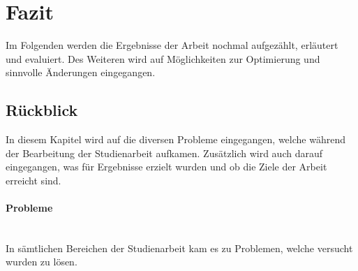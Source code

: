 \section{Fazit}
Im Folgenden werden die Ergebnisse der Arbeit nochmal aufgezählt, erläutert und evaluiert.
Des Weiteren wird auf Möglichkeiten zur Optimierung und sinnvolle Änderungen eingegangen.

\subsection{Rückblick}
In diesem Kapitel wird auf die diversen Probleme eingegangen, welche während der Bearbeitung der Studienarbeit aufkamen.
Zusätzlich wird auch darauf eingegangen, was für Ergebnisse erzielt wurden und ob die Ziele der Arbeit erreicht sind.

\paragraph{Probleme} \label{probleme}\mbox{}\\
In sämtlichen Bereichen der Studienarbeit kam es zu Problemen, welche versucht wurden zu lösen.

